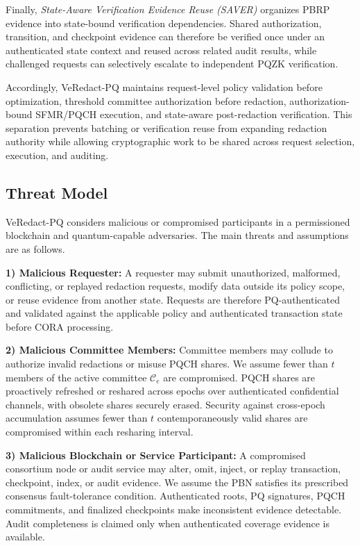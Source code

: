 \documentclass[lettersize,journal]{IEEEtran}
\begin{document}
Finally, \emph{State-Aware Verification Evidence Reuse (SAVER)}
organizes PBRP evidence into state-bound verification dependencies.
Shared authorization, transition, and checkpoint evidence can therefore
be verified once under an authenticated state context and reused across
related audit results, while challenged requests can selectively
escalate to independent PQZK verification.

Accordingly, VeRedact-PQ maintains request-level policy validation
before optimization, threshold committee authorization before
redaction, authorization-bound SFMR/PQCH execution, and state-aware
post-redaction verification. This separation prevents batching or
verification reuse from expanding redaction authority while allowing
cryptographic work to be shared across request selection, execution,
and auditing.
\subsection{Threat Model}

VeRedact-PQ considers malicious or compromised participants in a
permissioned blockchain and quantum-capable adversaries. The main
threats and assumptions are as follows.

\textbf{1) Malicious Requester:}
A requester may submit unauthorized, malformed, conflicting, or replayed
redaction requests, modify data outside its policy scope, or reuse
evidence from another state. Requests are therefore PQ-authenticated
and validated against the applicable policy and authenticated
transaction state before CORA processing.

\textbf{2) Malicious Committee Members:}
Committee members may collude to authorize invalid redactions or misuse
PQCH shares. We assume fewer than $t$ members of the active committee
$\mathcal{C}_e$ are compromised. PQCH shares are proactively refreshed
or reshared across epochs over authenticated confidential channels,
with obsolete shares securely erased. Security against cross-epoch
accumulation assumes fewer than $t$ contemporaneously valid shares are
compromised within each resharing interval.

\textbf{3) Malicious Blockchain or Service Participant:}
A compromised consortium node or audit service may alter, omit, inject,
or replay transaction, checkpoint, index, or audit evidence. We assume
the PBN satisfies its prescribed consensus fault-tolerance condition.
Authenticated roots, PQ signatures, PQCH commitments, and finalized
checkpoints make inconsistent evidence detectable. Audit completeness
is claimed only when authenticated coverage evidence is available.
\end{document}
